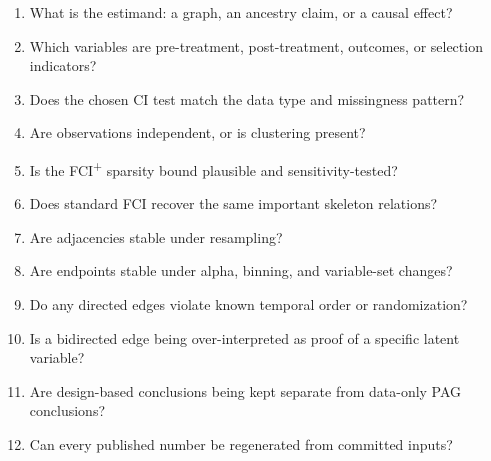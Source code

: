 \documentclass[11pt,a4paper,oneside]{report}
\newcommand{\FCIplus}{FCI\textsuperscript{+}}
\begin{document}
\begin{enumerate}[leftmargin=2em]
  \item What is the estimand: a graph, an ancestry claim, or a causal effect?
  \item Which variables are pre-treatment, post-treatment, outcomes, or
        selection indicators?
  \item Does the chosen CI test match the data type and missingness pattern?
  \item Are observations independent, or is clustering present?
  \item Is the \FCIplus{} sparsity bound plausible and sensitivity-tested?
  \item Does standard FCI recover the same important skeleton relations?
  \item Are adjacencies stable under resampling?
  \item Are endpoints stable under alpha, binning, and variable-set changes?
  \item Do any directed edges violate known temporal order or randomization?
  \item Is a bidirected edge being over-interpreted as proof of a specific
        latent variable?
  \item Are design-based conclusions being kept separate from data-only PAG
        conclusions?
  \item Can every published number be regenerated from committed inputs?
\end{enumerate}
\end{document}
